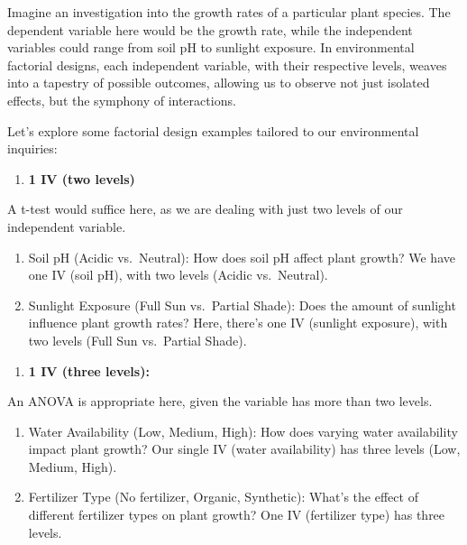 \documentclass[
  letterpaper,
  DIV=11,
  numbers=noendperiod]{scrreprt}
\providecommand{\tightlist}{%
  \setlength{\itemsep}{0pt}\setlength{\parskip}{0pt}}
\begin{document}
Imagine an investigation into the growth rates of a particular plant
species. The dependent variable here would be the growth rate, while the
independent variables could range from soil pH to sunlight exposure. In
environmental factorial designs, each independent variable, with their
respective levels, weaves into a tapestry of possible outcomes, allowing
us to observe not just isolated effects, but the symphony of
interactions.

Let's explore some factorial design examples tailored to our
environmental inquiries:

\begin{enumerate}
\def\labelenumi{\arabic{enumi}.}
\tightlist
\item
  \textbf{1 IV (two levels)}
\end{enumerate}

A t-test would suffice here, as we are dealing with just two levels of
our independent variable.

\begin{enumerate}
\def\labelenumi{\alph{enumi}.}
\item
  Soil pH (Acidic vs.~Neutral): How does soil pH affect plant growth? We
  have one IV (soil pH), with two levels (Acidic vs.~Neutral).
\item
  Sunlight Exposure (Full Sun vs.~Partial Shade): Does the amount of
  sunlight influence plant growth rates? Here, there's one IV (sunlight
  exposure), with two levels (Full Sun vs.~Partial Shade).
\end{enumerate}

\begin{enumerate}
\def\labelenumi{\arabic{enumi}.}
\setcounter{enumi}{1}
\tightlist
\item
  \textbf{1 IV (three levels):}
\end{enumerate}

An ANOVA is appropriate here, given the variable has more than two
levels.

\begin{enumerate}
\def\labelenumi{\alph{enumi}.}
\item
  Water Availability (Low, Medium, High): How does varying water
  availability impact plant growth? Our single IV (water availability)
  has three levels (Low, Medium, High).
\item
  Fertilizer Type (No fertilizer, Organic, Synthetic): What's the effect
  of different fertilizer types on plant growth? One IV (fertilizer
  type) has three levels.
\end{enumerate}
\end{document}
